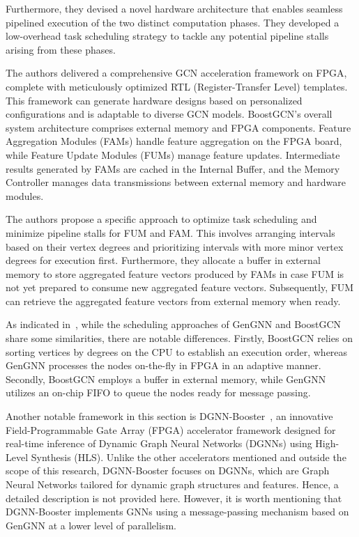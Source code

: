Furthermore, they devised a novel hardware architecture that enables seamless pipelined execution of the two distinct computation phases.
They developed a low-overhead task scheduling strategy to tackle any potential pipeline stalls arising from these phases.

The authors delivered a comprehensive GCN acceleration framework on FPGA, complete with meticulously optimized RTL (Register-Transfer Level) templates.
This framework can generate hardware designs based on personalized configurations and is adaptable to diverse GCN models.
BoostGCN's overall system architecture comprises external memory and FPGA components.
Feature Aggregation Modules (FAMs) handle feature aggregation on the FPGA board, while Feature Update Modules (FUMs) manage feature updates.
Intermediate results generated by FAMs are cached in the Internal Buffer, and the Memory Controller manages data transmissions between external memory and hardware modules.

The authors propose a specific approach to optimize task scheduling and minimize pipeline stalls for FUM and FAM. This involves arranging intervals based on their vertex degrees and prioritizing intervals with more minor vertex degrees for execution first.
Furthermore, they allocate a buffer in external memory to store aggregated feature vectors produced by FAMs in case FUM is not yet prepared to consume new aggregated feature vectors.
Subsequently, FUM can retrieve the aggregated feature vectors from external memory when ready.

As indicated in~\cite{DBLP:journals/corr/abs-2201-08475}, while the scheduling approaches of GenGNN and BoostGCN share some similarities, there are notable differences.
Firstly, BoostGCN relies on sorting vertices by degrees on the CPU to establish an execution order, whereas GenGNN processes the nodes on-the-fly in FPGA in an adaptive manner.
Secondly, BoostGCN employs a buffer in external memory, while GenGNN utilizes an on-chip FIFO to queue the nodes ready for message passing.

Another notable framework in this section is DGNN-Booster~\cite{chen2023dgnnbooster}, an innovative Field-Programmable Gate Array (FPGA) accelerator framework designed for real-time inference of Dynamic Graph Neural Networks (DGNNs) using High-Level Synthesis (HLS).
Unlike the other accelerators mentioned and outside the scope of this research, DGNN-Booster focuses on DGNNs, which are Graph Neural Networks tailored for dynamic graph structures and features.
Hence, a detailed description is not provided here.
However, it is worth mentioning that DGNN-Booster implements GNNs using a message-passing mechanism based on GenGNN at a lower level of parallelism.

